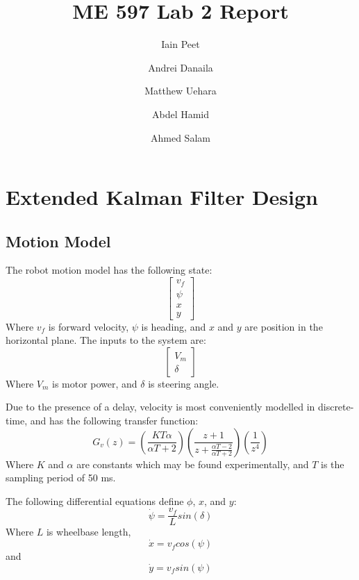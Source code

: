 \documentclass[11pt]{article} %
\title{ME 597 Lab 2 Report}
\author{Iain Peet \and Andrei Danaila \and Matthew Uehara \and Abdel Hamid \and Ahmed Salam}
\begin{document}
\maketitle

\clearpage

\section{Extended Kalman Filter Design}

\subsection{Motion Model}
The robot motion model has the following state:
\begin{equation}
\left[ \begin{array}{c}
v_f \\
\psi \\
x \\
y
\end{array} \right] 
\end{equation}
Where $v_f$ is forward velocity, $\psi$ is heading, and $x$ and $y$ are position in the horizontal plane.  The inputs to the system are:
\begin{equation}
\left[ \begin{array}{c}
V_m \\
\delta
\end{array} \right]
\end{equation}
Where $V_m$ is motor power, and $\delta$ is steering angle.

Due to the presence of a delay, velocity is most conveniently modelled in discrete-time, and has the following transfer function:
\begin{equation}
G_v(z) =  (\frac{K T \alpha}{\alpha T + 2}) (\frac{z + 1}{z + \frac{\alpha T - 2}{\alpha T + 2}}) (\frac{1}{z^4})
\label{vf}
\end{equation}
Where $K$ and $\alpha$ are constants which may be found experimentally, and $T$ is the sampling period of 50 ms.

The following differential equations define $\phi$, $x$, and $y$:
\begin{equation}
\dot{\psi} = \frac{v_f}{L} sin(\delta)
\end{equation}
Where $L$ is wheelbase length,
\begin{equation}
\dot{x} = v_f cos( \psi )
\end{equation}
and
\begin{equation}
\dot{y} = v_f sin( \psi )
\label{y}
\end{equation}
\end{document}
